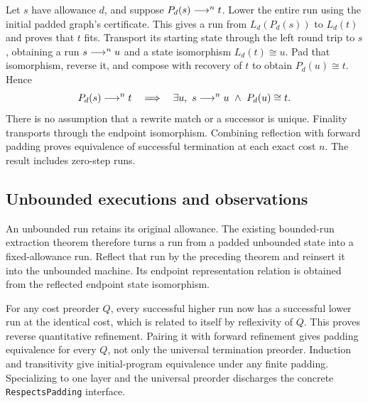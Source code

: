 
Let $s$ have allowance $d$, and suppose $P_d(s)\mathrel{\longrightarrow^{n}}t$. Lower the entire
run using the initial padded graph's certificate. This gives a run from
$L_d(P_d(s))$ to $L_d(t)$ and proves that $t$ fits. Transport its starting state
through the left round trip to $s$, obtaining a run $s\mathrel{\longrightarrow^{n}}u$ and a state
isomorphism $L_d(t)\cong u$. Pad that isomorphism, reverse it, and compose with
recovery of $t$ to obtain $P_d(u)\cong t$. Hence
\[
 P_d(s)\mathrel{\longrightarrow^{n}}t\quad\Longrightarrow\quad
 \exists u,\ s\mathrel{\longrightarrow^{n}}u\ \land\ P_d(u)\cong t.
\]
There is no assumption that a rewrite match or a successor is unique.
Finality transports through the endpoint isomorphism. Combining reflection
with forward padding proves equivalence of successful termination at each
exact cost $n$. The result includes zero-step runs.



\subsection{Unbounded executions and observations}

An unbounded run retains its original allowance. The existing bounded-run
extraction theorem therefore turns a run from a padded unbounded state into a
fixed-allowance run. Reflect that run by the preceding theorem and reinsert it
into the unbounded machine. Its endpoint representation relation is obtained
from the reflected endpoint state isomorphism.

For any cost preorder $Q$, every successful higher run now has a successful
lower run at the identical cost, which is related to itself by reflexivity of
$Q$. This proves reverse quantitative refinement. Pairing it with forward
refinement gives padding equivalence for every $Q$, not only the universal
termination preorder. Induction and transitivity give initial-program
equivalence under any finite padding. Specializing to one layer and the
universal preorder discharges the concrete \texttt{RespectsPadding} interface.



